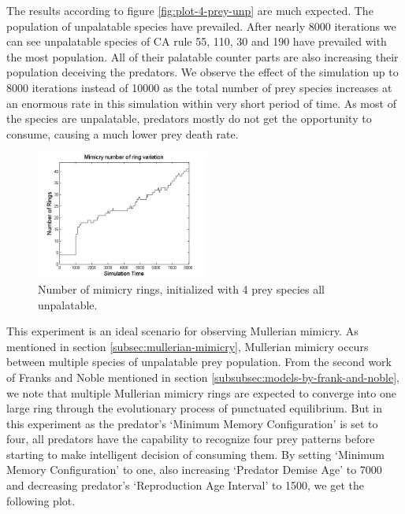 \documentclass[letterpaper]{article}
\numberwithin{equation}{section}
\begin{document}
The results according to figure \ref{fig:plot-4-prey-unp} are much expected. The population of unpalatable species have prevailed. After nearly 8000 iterations we can see unpalatable species of CA rule 55, 110, 30 and 190 have prevailed with the most population. All of their palatable counter parts are also increasing their population deceiving the predators. We observe the effect of the simulation up to 8000 iterations instead of 10000 as the total number of prey species increases at an enormous rate in this simulation within very short period of time. As most of the species are unpalatable, predators mostly do not get the opportunity to consume, causing a much lower prey death rate. 

\begin{figure}[H]
	\centering
	\includegraphics[width=0.5\textwidth]{../tex/images/ringSize8k-4Prey-unp}
	\caption[Number of mimicry rings (4 prey species all unpalatable)]{Number of mimicry rings, initialized with 4 prey species all unpalatable.}
	\label{fig:ringSize10k-4-Prey-unp}
\end{figure}

This experiment is an ideal scenario for observing Mullerian mimicry. As mentioned in section \ref{subsec:mullerian-mimicry}, Mullerian mimicry occurs between multiple species of unpalatable prey population. From the second work of Franks and Noble \cite{franks2003} mentioned in section \ref{subsubsec:models-by-frank-and-noble}, we note that multiple Mullerian mimicry rings are expected to converge into one large ring through the evolutionary process of punctuated equilibrium. But in this experiment as the predator's `Minimum Memory Configuration' is set to four, all predators have the capability to recognize four prey patterns before starting to make intelligent decision of consuming them. By setting `Minimum Memory Configuration' to one, also increasing `Predator Demise Age' to 7000 and decreasing predator's `Reproduction Age Interval' to 1500, we get the following plot. 
\end{document}
